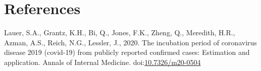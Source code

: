 \documentclass[]{elsarticle} %
\begin{document}
\hypertarget{references}{%
\section*{References}\label{references}}

\hypertarget{refs}{}
\leavevmode\hypertarget{ref-Lauer2020incubation}{}%
Lauer, S.A., Grantz, K.H., Bi, Q., Jones, F.K., Zheng, Q., Meredith,
H.R., Azman, A.S., Reich, N.G., Lessler, J., 2020. The incubation period
of coronavirus disease 2019 (covid-19) from publicly reported confirmed
cases: Estimation and application. Annals of Internal Medicine.
doi:\href{https://doi.org/10.7326/m20-0504}{10.7326/m20-0504}
\end{document}
